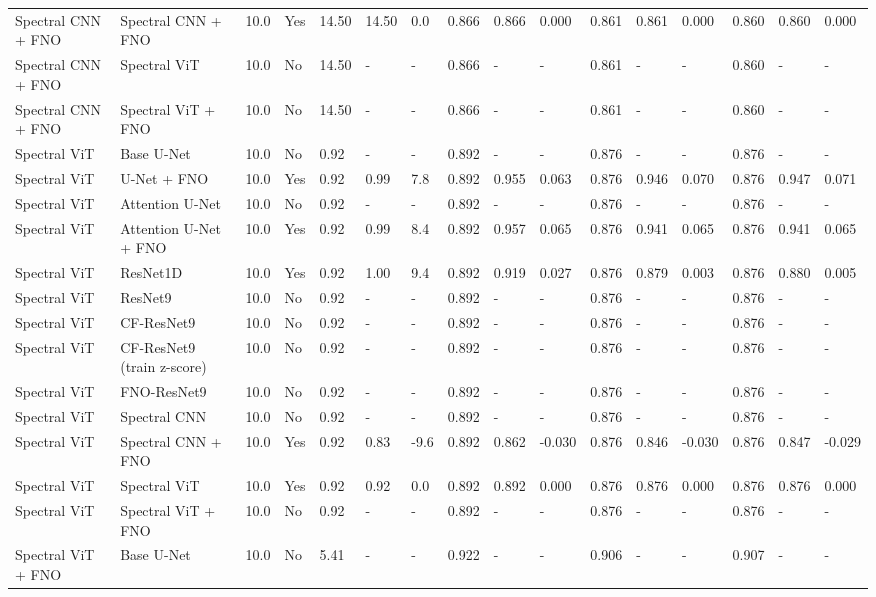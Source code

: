 \begin{longtable}{llllllllllllllll}
Spectral CNN + FNO & Spectral CNN + FNO & 10.0 & Yes & 14.50 & 14.50 & 0.0 & 0.866 & 0.866 & 0.000 & 0.861 & 0.861 & 0.000 & 0.860 & 0.860 & 0.000 \\
Spectral CNN + FNO & Spectral ViT & 10.0 & No & 14.50 & - & - & 0.866 & - & - & 0.861 & - & - & 0.860 & - & - \\
Spectral CNN + FNO & Spectral ViT + FNO & 10.0 & No & 14.50 & - & - & 0.866 & - & - & 0.861 & - & - & 0.860 & - & - \\
Spectral ViT & Base U-Net & 10.0 & No & 0.92 & - & - & 0.892 & - & - & 0.876 & - & - & 0.876 & - & - \\
Spectral ViT & U-Net + FNO & 10.0 & Yes & 0.92 & 0.99 & 7.8 & 0.892 & 0.955 & 0.063 & 0.876 & 0.946 & 0.070 & 0.876 & 0.947 & 0.071 \\
Spectral ViT & Attention U-Net & 10.0 & No & 0.92 & - & - & 0.892 & - & - & 0.876 & - & - & 0.876 & - & - \\
Spectral ViT & Attention U-Net + FNO & 10.0 & Yes & 0.92 & 0.99 & 8.4 & 0.892 & 0.957 & 0.065 & 0.876 & 0.941 & 0.065 & 0.876 & 0.941 & 0.065 \\
Spectral ViT & ResNet1D & 10.0 & Yes & 0.92 & 1.00 & 9.4 & 0.892 & 0.919 & 0.027 & 0.876 & 0.879 & 0.003 & 0.876 & 0.880 & 0.005 \\
Spectral ViT & ResNet9 & 10.0 & No & 0.92 & - & - & 0.892 & - & - & 0.876 & - & - & 0.876 & - & - \\
Spectral ViT & CF-ResNet9 & 10.0 & No & 0.92 & - & - & 0.892 & - & - & 0.876 & - & - & 0.876 & - & - \\
Spectral ViT & CF-ResNet9 (train z-score) & 10.0 & No & 0.92 & - & - & 0.892 & - & - & 0.876 & - & - & 0.876 & - & - \\
Spectral ViT & FNO-ResNet9 & 10.0 & No & 0.92 & - & - & 0.892 & - & - & 0.876 & - & - & 0.876 & - & - \\
Spectral ViT & Spectral CNN & 10.0 & No & 0.92 & - & - & 0.892 & - & - & 0.876 & - & - & 0.876 & - & - \\
Spectral ViT & Spectral CNN + FNO & 10.0 & Yes & 0.92 & 0.83 & -9.6 & 0.892 & 0.862 & -0.030 & 0.876 & 0.846 & -0.030 & 0.876 & 0.847 & -0.029 \\
Spectral ViT & Spectral ViT & 10.0 & Yes & 0.92 & 0.92 & 0.0 & 0.892 & 0.892 & 0.000 & 0.876 & 0.876 & 0.000 & 0.876 & 0.876 & 0.000 \\
Spectral ViT & Spectral ViT + FNO & 10.0 & No & 0.92 & - & - & 0.892 & - & - & 0.876 & - & - & 0.876 & - & - \\
Spectral ViT + FNO & Base U-Net & 10.0 & No & 5.41 & - & - & 0.922 & - & - & 0.906 & - & - & 0.907 & - & - \\

\end{longtable}
